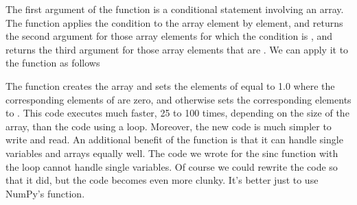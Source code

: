 \documentclass[letterpaper,10pt,english]{sphinxmanual}
\begin{document}
\begin{sphinxVerbatim}[commandchars=\\\{\}]
      
\end{sphinxVerbatim}

\sphinxAtStartPar
The first argument of the  function is a conditional statement involving an array.  The  function applies the condition to the array element by element, and returns the second argument for those array elements for which the condition is , and returns the third argument for those array elements that are .  We can apply it to the  function as follows

\begin{sphinxVerbatim}[commandchars=\\\{\}]
 
        
     
\end{sphinxVerbatim}

\sphinxAtStartPar
The  function creates the array  and sets the elements of  equal to 1.0 where the corresponding elements of  are zero, and otherwise sets the corresponding elements to .  This code executes much faster, 25 to 100 times, depending on the size of the array, than the code using a  loop.  Moreover, the new code is much simpler to write and read.  An additional benefit of the  function is that it can handle single variables and arrays equally well.  The code we wrote for the sinc function with the  loop cannot handle single variables.  Of course we could rewrite the code so that it did, but the code becomes even more clunky.  It’s better just to use NumPy’s  function.
\end{document}
